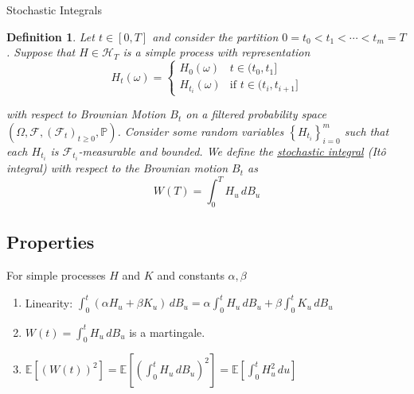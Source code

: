 \documentclass[12pt]{article}
\newtheorem{definition}{Definition}
\begin{document}
\begin{section}{Stochastic Integrals}
\begin{definition} Let $t \in [0,T]$ and consider the partition $0 = t_0 < t_1 < \cdots < t_m = T$. Suppose that $H \in \mathcal H_T$ is a simple process with representation
\begin{equation*}
	H_t(\omega) =
	\begin{cases}
		H_0(\omega) & t \in (t_0, t_1] \\
		H_{t_i}(\omega) & \text{if } t \in (t_i, t_{i + 1}]
	\end{cases}
\end{equation*}

with respect to Brownian Motion $B_t$ on a filtered probability space $(\Omega, \mathcal F, (\mathcal F_t)_{t\geq0},\mathbb P)$. Consider some random variables $\left\{ H_{t_i} \right\}^m_{i = 0}$ such that each $H_{t_i}$ is $\mathcal F_{t_i}$-measurable and bounded. We define the \underline{stochastic integral} (It\^{o} integral) with respect to the Brownian motion $B_t$ as
\begin{equation*}
	W(T) = \int^T_0 H_u \,dB_u
\end{equation*}

\end{definition}

\subsection{Properties}
\noindent For simple processes $H$ and $K$ and constants $\alpha, \beta$
\begin{enumerate}
	\item Linearity: $\int^t_0 (\alpha H_u + \beta K_u)\,dB_u = \alpha\int^t_0 H_u\,dB_u + \beta\int^t_0 K_u\,dB_u$
	\item $W(t) = \int^t_0 H_u\,dB_u$ is a martingale.
	\item $\mathbb E[(W(t))^2] = \mathbb E[(\int^t_0 H_u\,dB_u)^2] = \mathbb E[\int^t_0 H^2_u\,du]$
\end{enumerate}


\end{section}
\end{document}

